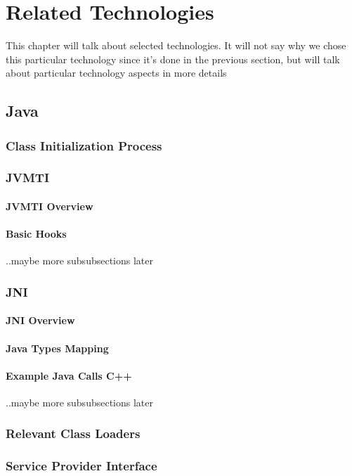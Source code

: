 \chapter{Related Technologies}
This chapter will talk about selected technologies. It will not say why we chose this particular technology since it's done in the previous section, but will talk about particular technology aspects in more details
\section{Java}
\subsection{Class Initialization Process}
\subsection{JVMTI}
\subsubsection{JVMTI Overview}
\subsubsection{Basic Hooks}
..maybe more subsubsections later
\subsection{JNI}
\subsubsection{JNI Overview}
\subsubsection{Java Types Mapping}
\subsubsection{Example Java Calls  C++}
..maybe more subsubsections later
\subsection{Relevant Class Loaders}
\subsection{Service Provider Interface}


